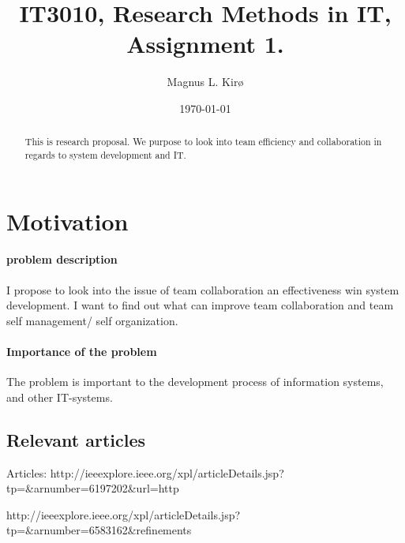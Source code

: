 \documentclass[12pt, a4paper]{article}
\title{
	IT3010, Research Methods in IT, Assignment 1. 
}
\author{
	Magnus L. Kirø \\
}
\date{\today}
\begin{document}
\maketitle
{}

\begin{abstract}
This is research proposal. We purpose to look into team efficiency and
collaboration in regards to system development and IT. 
\end{abstract}



\section{Motivation}

\paragraph{problem description}
I propose to look into the issue of team collaboration an effectiveness win
system development. I want to find out what can improve team collaboration and
team self management/ self organization.    

\paragraph{Importance of the problem}
The problem is important to the development process of information systems, and
other IT-systems.  

\subsection{Relevant articles}

Articles: 
http://ieeexplore.ieee.org/xpl/articleDetails.jsp?tp=&arnumber=6197202&url=http%

http://ieeexplore.ieee.org/xpl/articleDetails.jsp?tp=&arnumber=6583162&refinements%
\end{document}
